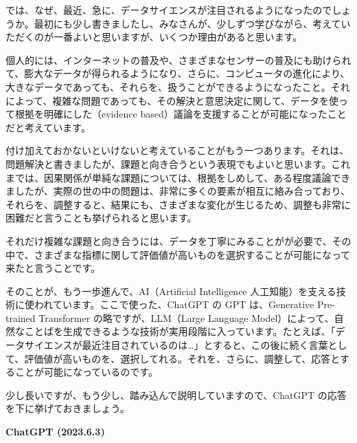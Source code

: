 \documentclass[
  xelatex, ja=standard]{bxjsbook}
\theoremstyle{definition}
\theoremstyle{definition}
\theoremstyle{definition}
\theoremstyle{definition}
\theoremstyle{remark}
\begin{document}
では、なぜ、最近、急に、データサイエンスが注目されるようになったのでしょうか。最初にも少し書きましたし、みなさんが、少しずつ学びながら、考えていただくのが一番よいと思いますが、いくつか理由があると思います。

個人的には、インターネットの普及や、さまざまなセンサーの普及にも助けられて、膨大なデータが得られるようになり、さらに、コンピュータの進化により、大きなデータであっても、それらを、扱うことができるようになったこと。それによって、複雑な問題であっても、その解決と意思決定に関して、データを使って根拠を明確にした（evidence based）議論を支援することが可能になったことだと考えています。

付け加えておかないといけないと考えていることがもう一つあります。それは、問題解決と書きましたが、課題と向き合うという表現でもよいと思います。これまでは、因果関係が単純な課題については、根拠をしめして、ある程度議論できましたが、実際の世の中の問題は、非常に多くの要素が相互に絡み合っており、それらを、調整すると、結果にも、さまざまな変化が生じるため、調整も非常に困難だと言うことも挙げられると思います。

それだけ複雑な課題と向き合うには、データを丁寧にみることがが必要で、その中で、さまざまな指標に関して評価値が高いものを選択することが可能になって来たと言うことです。

そのことが、もう一歩進んで、AI（Artificial Intelligence 人工知能）を支える技術に使われています。ここで使った、ChatGPT の GPT は、Generative Pre-trained Transformer の略ですが、LLM（Large Language Model）によって、自然なことばを生成できるような技術が実用段階に入っています。たとえば、「データサイエンスが最近注目されているのは\ldots」とすると、この後に続く言葉として、評価値が高いものを、選択してれる。それを、さらに、調整して、応答とすることが可能になっているのです。

少し長いですが、もう少し、踏み込んで説明していますので、ChatGPT の応答を下に挙げておきましょう。

\textbf{ChatGPT (2023.6.3)}
\end{document}
